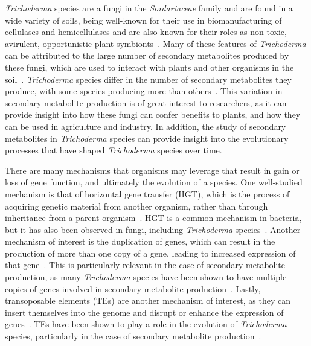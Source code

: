 \textit{Trichoderma} species are a fungi in the \textit{Sordariaceae} family and are found in a wide variety of soils, being well-known for their use in biomanufacturing
of cellulases and hemicellulases and are also known for their roles as non-toxic,
avirulent, opportunistic plant symbionts~\cite{woo2023a, kubicek2019a}. 
Many of these features of \textit{Trichoderma}
can be attributed to the large number of secondary metabolites
produced by these fungi, which are used to interact with plants and other organisms in the soil~\cite{Mukherjee2012}. \textit{Trichoderma} species differ in the number of secondary metabolites they produce, with some species producing more than others~\cite{Mukherjee2012}. This variation in secondary metabolite production is of great interest to researchers, as it can provide insight into how these fungi can confer benefits to plants, and how they can be used in agriculture and industry. In addition, the study of secondary metabolites in \textit{Trichoderma} species can provide insight into
the evolutionary processes that have shaped \textit{Trichoderma} species over time.

There are many mechanisms that organisms may leverage that result in gain or loss of gene function, and ultimately the evolution of a species. One well-studied mechanism is that of horizontal gene transfer (HGT), which is the process of acquiring genetic material from another organism, rather than through inheritance from a parent organism~\cite{goncalves2024}. HGT is a common mechanism in bacteria, but it has also been observed in fungi, including \textit{Trichoderma} species~\cite{goncalves2024}. Another mechanism of interest is the duplication of genes, which can result in the production of more than one copy of a gene, leading to increased expression of that gene~\cite{goncalves2024}. This is particularly relevant in the case of secondary metabolite production, as many \textit{Trichoderma} species have been shown to have multiple copies of genes involved in secondary metabolite production~\cite{Mukherjee2012}. Lastly, transoposable elements (TEs) are another mechanism of interest, as they can insert themselves into the genome and disrupt or enhance the expression of genes~\cite{goncalves2024}. TEs have been shown to play a role in the evolution of \textit{Trichoderma} species, particularly in the case of secondary metabolite production~\cite{goncalves2024}. 

